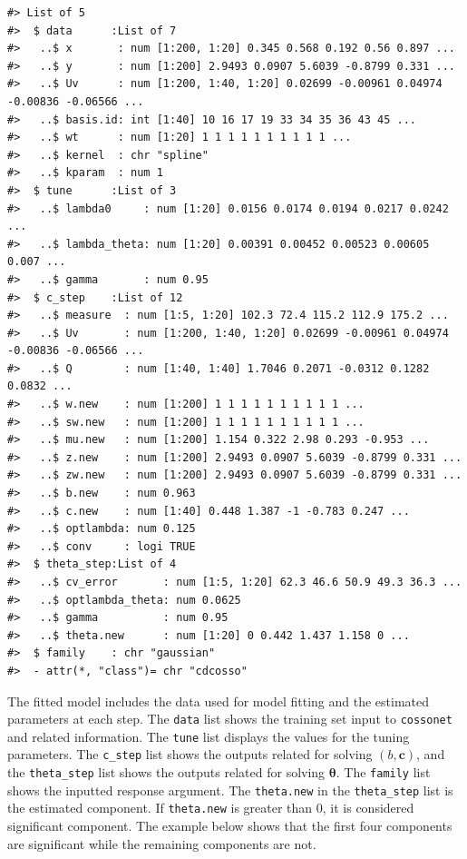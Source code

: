 \begin{verbatim}
#> List of 5
#>  $ data      :List of 7
#>   ..$ x       : num [1:200, 1:20] 0.345 0.568 0.192 0.56 0.897 ...
#>   ..$ y       : num [1:200] 2.9493 0.0907 5.6039 -0.8799 0.331 ...
#>   ..$ Uv      : num [1:200, 1:40, 1:20] 0.02699 -0.00961 0.04974 -0.00836 -0.06566 ...
#>   ..$ basis.id: int [1:40] 10 16 17 19 33 34 35 36 43 45 ...
#>   ..$ wt      : num [1:20] 1 1 1 1 1 1 1 1 1 1 ...
#>   ..$ kernel  : chr "spline"
#>   ..$ kparam  : num 1
#>  $ tune      :List of 3
#>   ..$ lambda0     : num [1:20] 0.0156 0.0174 0.0194 0.0217 0.0242 ...
#>   ..$ lambda_theta: num [1:20] 0.00391 0.00452 0.00523 0.00605 0.007 ...
#>   ..$ gamma       : num 0.95
#>  $ c_step    :List of 12
#>   ..$ measure  : num [1:5, 1:20] 102.3 72.4 115.2 112.9 175.2 ...
#>   ..$ Uv       : num [1:200, 1:40, 1:20] 0.02699 -0.00961 0.04974 -0.00836 -0.06566 ...
#>   ..$ Q        : num [1:40, 1:40] 1.7046 0.2071 -0.0312 0.1282 0.0832 ...
#>   ..$ w.new    : num [1:200] 1 1 1 1 1 1 1 1 1 1 ...
#>   ..$ sw.new   : num [1:200] 1 1 1 1 1 1 1 1 1 1 ...
#>   ..$ mu.new   : num [1:200] 1.154 0.322 2.98 0.293 -0.953 ...
#>   ..$ z.new    : num [1:200] 2.9493 0.0907 5.6039 -0.8799 0.331 ...
#>   ..$ zw.new   : num [1:200] 2.9493 0.0907 5.6039 -0.8799 0.331 ...
#>   ..$ b.new    : num 0.963
#>   ..$ c.new    : num [1:40] 0.448 1.387 -1 -0.783 0.247 ...
#>   ..$ optlambda: num 0.125
#>   ..$ conv     : logi TRUE
#>  $ theta_step:List of 4
#>   ..$ cv_error       : num [1:5, 1:20] 62.3 46.6 50.9 49.3 36.3 ...
#>   ..$ optlambda_theta: num 0.0625
#>   ..$ gamma          : num 0.95
#>   ..$ theta.new      : num [1:20] 0 0.442 1.437 1.158 0 ...
#>  $ family    : chr "gaussian"
#>  - attr(*, "class")= chr "cdcosso"
\end{verbatim}

The fitted model includes the data used for model fitting and the estimated parameters at each step. The \texttt{data} list shows the training set input to \texttt{cossonet} and related information. The \texttt{tune} list displays the values for the tuning parameters. The \texttt{c\_step} list shows the outputs related for solving \((b, \pmb{c})\), and the \texttt{theta\_step} list shows the outputs related for solving \(\pmb{\theta}\). The \texttt{family} list shows the inputted response argument. The \texttt{theta.new} in the \texttt{theta\_step} list is the estimated component. If \texttt{theta.new} is greater than 0, it is considered significant component. The example below shows that the first four components are significant while the remaining components are not.


